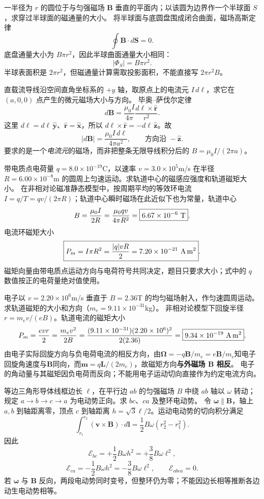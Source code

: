 \problemtext 一半径为 $r$ 的圆位于与匀强磁场 $\bm B$ 垂直的平面内；以该圆为边界作一个半球面 $S$，求穿过半球面的磁通量的大小。
\workings 将半球面与底圆盘围成闭合曲面，磁场高斯定律
\[\oint\bm B\cdot d\bm S=0.\]
底盘通量大小为 $B\pi r^2$，因此半球曲面通量大小相同：
\[\boxed{|\Phi_S|=B\pi r^2}.\]
\crosscheck 半球表面积是 $2\pi r^2$，但磁通量计算需取投影面积，不能直接写 $2\pi r^2B$。

\problemtext 直载流导线沿空间直角坐标系的 $+y$ 轴，取原点上的电流元 $I\,d\ell$，求它在 $(a,0,0)$ 点产生的微元磁场大小与方向。
\workings 毕奥--萨伐尔定律
\[d\bm B=\frac{\mu_0I}{4\pi}
\frac{d\bm\ell\times\hat{\bm r}}{r^2}.\]
这里 $d\bm\ell=d\ell\,\hat{\bm y}$、$\hat{\bm r}=\hat{\bm x}$，所以 $d\bm\ell\times\hat{\bm r}=-d\ell\,\hat{\bm z}$。故
\[
\boxed{|d\bm B|=\frac{\mu_0 I\,d\ell}{4\pi a^2}},\qquad
\boxed{\text{方向沿 }-\hat{\bm z}}.
\]
\crosscheck 要求的是一个\emph{电流元}的磁场，而非把整条无限导线积分后的 $B=\mu_0I/(2\pi a)$。

\problemtext 带电质点电荷量 $q=8.0\times10^{-19}$C，以速率 $v=3.0\times10^5$m/s 在半径 $R=6.00\times10^{-8}$m 的圆周上匀速运动。求轨道中心的磁感应强度和轨道磁矩大小。
\workings 在非相对论磁准静态模型中，按周期平均的等效环电流 $I=q/T=qv/(2\pi R)$；轨道中心瞬时磁场在此近似下也为常量，轨道中心
\[
B=\frac{\mu_0I}{2R}=\frac{\mu_0qv}{4\pi R^2}
=\boxed{6.67\times10^{-6}\ {\rm T}}.
\]
电流环磁矩大小
\[
\boxed{P_m=I\pi R^2=\frac{|q|vR}{2}
=7.20\times10^{-21}\ {\rm A\,m^2}}.
\]
\crosscheck 磁矩向量由带电质点运动方向与电荷符号共同决定，题目只要求大小；式中的 $q$ 数值按正的电荷量绝对值使用。

\problemtext 电子以 $v=2.20\times10^6$m/s 垂直于 $B=2.36$T 的均匀磁场射入，作匀速圆周运动。求轨道磁矩的大小和方向（$m_e=9.11\times10^{-31}$kg）。
\workings 非相对论模型下回旋半径 $r=m_ev/(eB)$。轨道电流的磁矩大小
\[
P_m=\frac{evr}{2}=\frac{m_ev^2}{2B}
=\frac{(9.11\times10^{-31})(2.20\times10^6)^2}{2(2.36)}
=\boxed{9.34\times10^{-19}\ {\rm A\,m^2}}.
\]
由电子实际回旋方向与负电荷电流的相反方向，由$\bm\Omega=-q\bm B/m_e=e\bm B/m_e$知电子回旋角速度与$\bm B$同向，而$\bm m=q\bm L/(2m_e)$，故磁矩方向\textbf{与外磁场 $\bm B$ 相反}。
\crosscheck 电子的角动量与其磁矩因负电荷而反向；不能用电子运动切向直接作为约定电流方向。

\problemtext 等边三角形导体线框边长 $\ell$，在平行边 $ab$ 的匀强磁场 $B$ 中绕 $ab$ 轴以 $\omega$ 转动；规定 $a\to b\to c\to a$ 为电动势正向。求 $bc$、$ca$ 及整环电动势。
\workings 令 $\bm\omega\parallel\bm B$，轴上 $a,b$ 到轴距离零，顶点 $c$ 到轴距离 $h=\sqrt3\ell/2$。运动电动势的切向积分满足
\[\int_{r_1}^{r_2}(\bm v\times\bm B)\cdot d\bm l
=\frac12B\omega(r_2^2-r_1^2).\]
因此
\[
\boxed{\mathcal E_{bc}=+\frac12B\omega h^2
=+\frac38B\omega\ell^2},
\]
\[
\boxed{\mathcal E_{ca}=-\frac12B\omega h^2
=-\frac38B\omega\ell^2},
\qquad\boxed{\mathcal E_{abca}=0}.
\]
\crosscheck 若 $\bm\omega$ 与 $\bm B$ 反向，两段电动势同时变号，但整环仍为零；不能因边长相等推断各边动生电动势相等。

